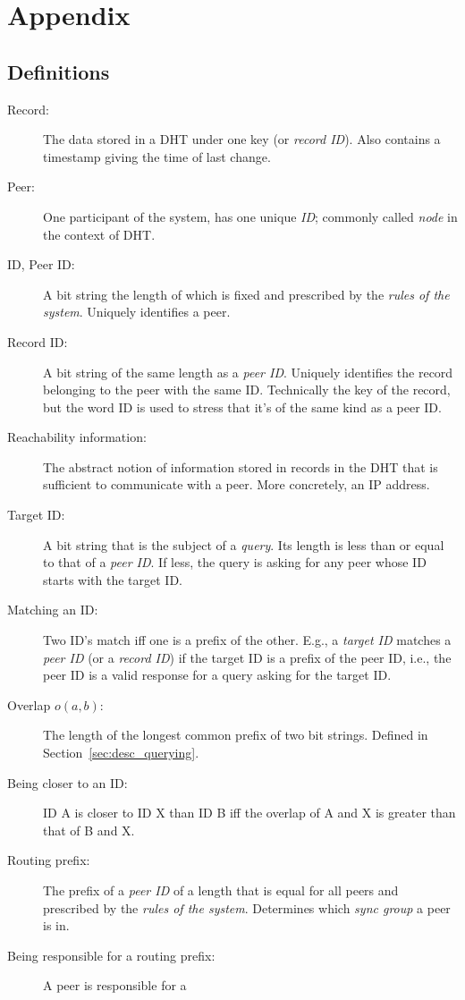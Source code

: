 \chapter{Appendix}
\section{Definitions}
\begin{description}
\item[Record:] The data stored in a DHT under one key (or \emph{record ID}).
Also contains a timestamp giving the time of last change.
\item[Peer:] One participant of the system, has one unique \emph{ID}; commonly
called \emph{node} in the context of DHT.
\item[ID, Peer ID:] A bit string the length of which is fixed and prescribed by
the \emph{rules of the system}. Uniquely identifies a peer.
\item[Record ID:] A bit string of the same length as a \emph{peer ID}. Uniquely
identifies the record belonging to the peer with the same ID. Technically the
key of the record, but the word ID is used to stress that it's of the same kind
as a peer ID.
\item[Reachability information:] The abstract notion of information stored in
records in the DHT that is sufficient to communicate with a peer. More
concretely, an IP address.
\item[Target ID:] A bit string that is the subject of a \emph{query}. Its length
is less than or equal to that of a \emph{peer ID}. If less, the query is asking
for any peer whose ID starts with the target ID.
\item[Matching an ID:] Two ID's match iff one is a prefix of the other. E.g., a
\emph{target ID} matches a \emph{peer ID} (or a \emph{record ID}) if the target
ID is a prefix of the peer ID, i.e., the peer ID is a valid response for a query
asking for the target ID.
\item[Overlap $o(a, b)$:] The length of the longest common prefix of two bit
strings. Defined in Section~\ref{sec:desc_querying}.
\item[Being closer to an ID:] ID A is closer to ID X than ID B iff the overlap
of A and X is greater than that of B and X.
\item[Routing prefix:] The prefix of a \emph{peer ID} of a length that is equal
for all peers and prescribed by the \emph{rules of the system}. Determines which
\emph{sync group} a peer is in.
\item[Being responsible for a routing prefix:] A peer is responsible for a

\end{description}
